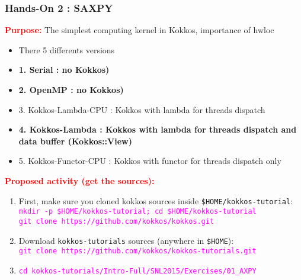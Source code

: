 \begin{frame}[fragile=singleslide]
  \frametitle{Hands-On 2 : SAXPY}

  \hypertarget{handson2}{}
  {\large \textcolor{red}{\bf Purpose:} The simplest computing kernel in Kokkos, importance of hwloc}

  
  \begin{itemize}
  \item There 5 differents versions
  \item \textbf{1. Serial : no Kokkos)}
  \item \textbf{2. OpenMP : no Kokkos)}
  \item 3. Kokkos-Lambda-CPU : Kokkos with lambda for threads dispatch
  \item \textbf{4. Kokkos-Lambda : Kokkos with lambda for threads dispatch and data buffer (Kokkos::View)}
  \item 5. Kokkos-Functor-CPU : Kokkos with functor for threads dispatch only
  \end{itemize}

  {\large \textcolor{red}{\bf Proposed activity (get the sources):}}
  {\small
    \begin{enumerate}
    \item First, make sure you cloned kokkos sources inside \texttt{\${HOME}/kokkos-tutorial}:\\
      \textcolor{magenta}{\texttt{mkdir -p \${HOME}/kokkos-tutorial; cd \${HOME}/kokkos-tutorial}}\\
      \textcolor{magenta}{\texttt{git clone  https://github.com/kokkos/kokkos.git}}
    \item Download \texttt{kokkos-tutorials} sources (anywhere in \texttt{\${HOME}}):\\
      \textcolor{magenta}{\texttt{git clone https://github.com/kokkos/kokkos-tutorials.git}}
    \item \textcolor{magenta}{\texttt{cd kokkos-tutorials/Intro-Full/SNL2015/Exercises/01\_AXPY}}
    \end{enumerate}
  }
  
\end{frame}

